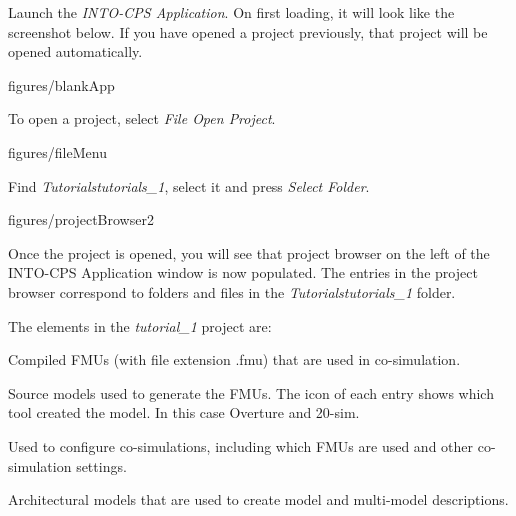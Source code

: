 \documentclass[11pt,a4paper]{../tutorial}
\begin{document}
\begin{instructions}
\item Launch the \emph{INTO-CPS Application}. On first loading, it will look like the screenshot below. If you have opened a project previously, that project will be opened automatically.

\begin{annotation}[width=0.85\linewidth]{figures/blankApp}
\end{annotation}

\item To open a project, select \emph{File \menusep Open Project}.

\begin{annotation}[width=0.85\linewidth,trim=0 260 0 0,clip]{figures/fileMenu}
\end{annotation}

\item Find \emph{Tutorials\pathsep{}tutorials\_1}, select it and press \emph{Select Folder}.

\begin{annotation}[width=0.85\linewidth]{figures/projectBrowser2}
\end{annotation}



\item Once the project is opened, you will see that project browser on the left of the INTO-CPS Application window is now populated. The entries in the project browser correspond to folders and files in the \emph{Tutorials\pathsep{}tutorials\_1} folder.

    The elements in the \emph{tutorial\_1} project are:

    \begin{description}[noitemsep]
        \item[FMUs] Compiled FMUs (with file extension .fmu) that are used in co-simulation.
        \item[Models] Source models used to generate the FMUs. The icon of each entry shows which tool created the model. In this case Overture and 20-sim.
        \item[Multi-models] Used to configure co-simulations, including which FMUs are used and other co-simulation settings.
        \item[SysML] Architectural models that are used to create model and multi-model descriptions.
    \end{description}


\end{instructions}
\end{document}

